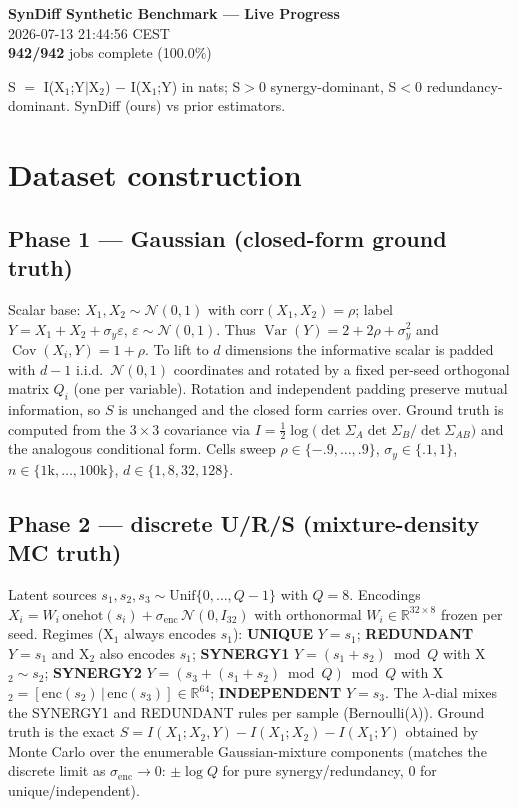 \documentclass[11pt]{article}
\begin{document}
\begin{center}{\Large\textbf{SynDiff Synthetic Benchmark — Live Progress}}\\[4pt]
2026-07-13 21:44:56 CEST\\[2pt]
\textbf{942/942} jobs complete (100.0\%)\end{center}
\vspace{6pt}
S $=$ I(X$_1$;Y$|$X$_2$) $-$ I(X$_1$;Y) in nats; S$>$0 synergy-dominant, S$<$0 redundancy-dominant. SynDiff (ours) vs prior estimators.
\section*{Dataset construction}
\subsection*{Phase 1 --- Gaussian (closed-form ground truth)}
Scalar base: $X_1,X_2\sim\mathcal N(0,1)$ with $\mathrm{corr}(X_1,X_2)=\rho$; label $Y=X_1+X_2+\sigma_y\varepsilon$, $\varepsilon\sim\mathcal N(0,1)$. Thus $\operatorname{Var}(Y)=2+2\rho+\sigma_y^2$ and $\operatorname{Cov}(X_i,Y)=1+\rho$. To lift to $d$ dimensions the informative scalar is padded with $d-1$ i.i.d.\ $\mathcal N(0,1)$ coordinates and rotated by a fixed per-seed orthogonal matrix $Q_i$ (one per variable). Rotation and independent padding preserve mutual information, so $S$ is unchanged and the closed form carries over. Ground truth is computed from the $3\times3$ covariance via $I=\tfrac12\log\!\big(\det\Sigma_A\det\Sigma_B/\det\Sigma_{AB}\big)$ and the analogous conditional form. Cells sweep $\rho\in\{-.9,\dots,.9\}$, $\sigma_y\in\{.1,1\}$, $n\in\{1\text{k},\dots,100\text{k}\}$, $d\in\{1,8,32,128\}$.
\subsection*{Phase 2 --- discrete U/R/S (mixture-density MC truth)}
Latent sources $s_1,s_2,s_3\sim\mathrm{Unif}\{0,\dots,Q-1\}$ with $Q=8$. Encodings $X_i=W_i\,\mathrm{onehot}(s_i)+\sigma_{\mathrm{enc}}\,\mathcal N(0,I_{32})$ with orthonormal $W_i\in\mathbb R^{32\times8}$ frozen per seed. Regimes (X$_1$ always encodes $s_1$): \textbf{UNIQUE} $Y{=}s_1$; \textbf{REDUNDANT} $Y{=}s_1$ and X$_2$ also encodes $s_1$; \textbf{SYNERGY1} $Y{=}(s_1{+}s_2)\bmod Q$ with X$_2\!\sim\!s_2$; \textbf{SYNERGY2} $Y{=}(s_3{+}(s_1{+}s_2)\bmod Q)\bmod Q$ with X$_2{=}[\mathrm{enc}(s_2)\,|\,\mathrm{enc}(s_3)]\in\mathbb R^{64}$; \textbf{INDEPENDENT} $Y{=}s_3$. The $\lambda$-dial mixes the SYNERGY1 and REDUNDANT rules per sample (Bernoulli($\lambda$)). Ground truth is the exact $S=I(X_1;X_2,Y)-I(X_1;X_2)-I(X_1;Y)$ obtained by Monte Carlo over the enumerable Gaussian-mixture components (matches the discrete limit as $\sigma_{\mathrm{enc}}\!\to\!0$: $\pm\log Q$ for pure synergy/redundancy, $0$ for unique/independent).
\end{document}
